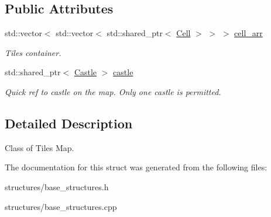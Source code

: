 \subsection*{Public Attributes}
\begin{DoxyCompactItemize}
\item 
\mbox{\label{structbase__structures_1_1Map___a0eb615f42edf0ffb9bc0ed324f7dea99}} 
std\+::vector$<$ std\+::vector$<$ std\+::shared\+\_\+ptr$<$ \hyperlink{classbase__structures_1_1Cell}{Cell} $>$ $>$ $>$ \hyperlink{structbase__structures_1_1Map___a0eb615f42edf0ffb9bc0ed324f7dea99}{cell\+\_\+arr}
\begin{DoxyCompactList}\small\item\em Tiles container. \end{DoxyCompactList}\item 
\mbox{\label{structbase__structures_1_1Map___a043120663bbf69aad79c4908ae3766d3}} 
std\+::shared\+\_\+ptr$<$ \hyperlink{classbase__structures_1_1Castle}{Castle} $>$ \hyperlink{structbase__structures_1_1Map___a043120663bbf69aad79c4908ae3766d3}{castle}
\begin{DoxyCompactList}\small\item\em Quick ref to castle on the map. Only one castle is permitted. \end{DoxyCompactList}\end{DoxyCompactItemize}


\subsection{Detailed Description}
Class of Tiles Map. 

The documentation for this struct was generated from the following files\+:\begin{DoxyCompactItemize}
\item 
structures/base\+\_\+structures.\+h\item 
structures/base\+\_\+structures.\+cpp\end{DoxyCompactItemize}
